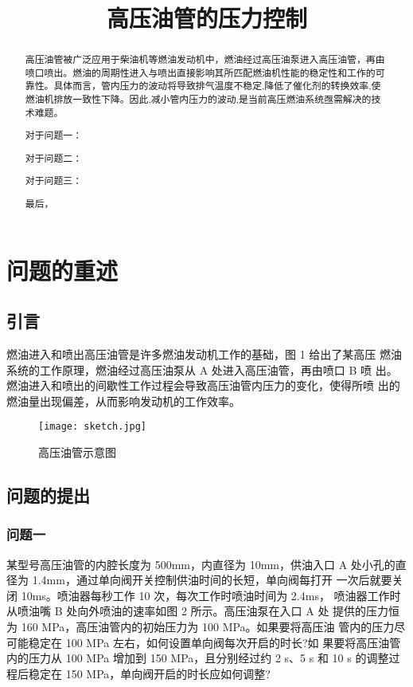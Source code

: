 \documentclass{cumcmthesis}
\title{高压油管的压力控制}
\begin{document}
 \maketitle
 \begin{abstract}
高压油管被广泛应用于柴油机等燃油发动机中，燃油经过高压油泵进入高压油管，再由喷口喷出。燃油的周期性进入与喷出直接影响其所匹配燃油机性能的稳定性和工作的可靠性。具体而言，管内压力的波动将导致排气温度不稳定,降低了催化剂的转换效率,使燃油机排放一致性下降。因此,减小管内压力的波动,是当前高压燃油系统亟需解决的技术难题。
\par 对于问题一：
\par 对于问题二：
\par 对于问题三：
\par 最后，









\end{abstract}


\section{问题的重述}
\subsection{引言}
燃油进入和喷出高压油管是许多燃油发动机工作的基础，图 1 给出了某高压 燃油系统的工作原理，燃油经过高压油泵从 A 处进入高压油管，再由喷口 B 喷 出。燃油进入和喷出的间歇性工作过程会导致高压油管内压力的变化，使得所喷 出的燃油量出现偏差，从而影响发动机的工作效率。

\begin{figure}[h]
	\centering
	\texttt{[image: sketch.jpg]}
	\caption{高压油管示意图}
\end{figure}

\subsection{问题的提出}
\subsubsection{问题一}
某型号高压油管的内腔长度为 500mm，内直径为 10mm，供油入口
A 处小孔的直径为 1.4mm，通过单向阀开关控制供油时间的长短，单向阀每打开 一次后就要关闭 10ms。喷油器每秒工作 10 次，每次工作时喷油时间为 2.4ms， 喷油器工作时从喷油嘴 B 处向外喷油的速率如图 2 所示。高压油泵在入口 A 处 提供的压力恒为 160 MPa，高压油管内的初始压力为 100 MPa。如果要将高压油 管内的压力尽可能稳定在 100 MPa 左右，如何设置单向阀每次开启的时长?如 果要将高压油管内的压力从 100 MPa 增加到 150 MPa，且分别经过约 2 s、5 s 和 10 s 的调整过程后稳定在 150 MPa，单向阀开启的时长应如何调整?
\end{document}
